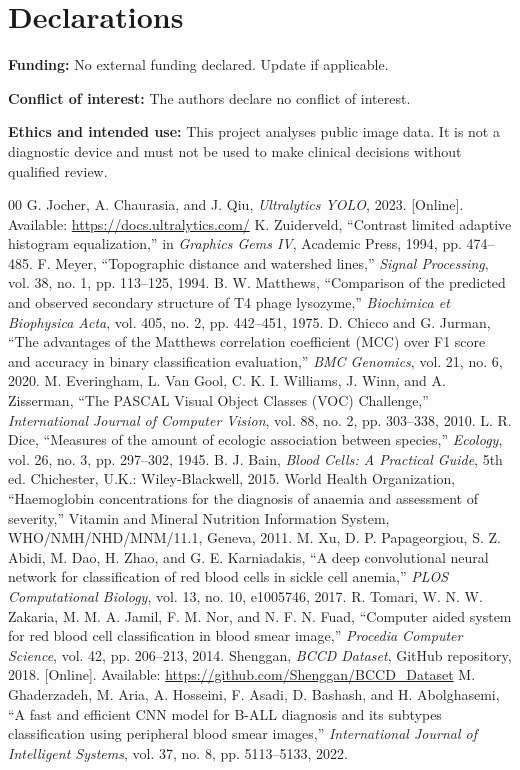 \documentclass[conference]{IEEEtran}
\begin{document}
\section*{Declarations}

\textbf{Funding:} No external funding declared. Update if applicable.

\textbf{Conflict of interest:} The authors declare no conflict of interest.

\textbf{Ethics and intended use:} This project analyses public image data. It is not a diagnostic device and must not be used to make clinical decisions without qualified review.

\begin{thebibliography}{00}
 G. Jocher, A. Chaurasia, and J. Qiu, \emph{Ultralytics YOLO}, 2023. [Online]. Available: \url{https://docs.ultralytics.com/}
 K. Zuiderveld, ``Contrast limited adaptive histogram equalization,'' in \emph{Graphics Gems IV}, Academic Press, 1994, pp. 474--485.
 F. Meyer, ``Topographic distance and watershed lines,'' \emph{Signal Processing}, vol. 38, no. 1, pp. 113--125, 1994.
 B. W. Matthews, ``Comparison of the predicted and observed secondary structure of T4 phage lysozyme,'' \emph{Biochimica et Biophysica Acta}, vol. 405, no. 2, pp. 442--451, 1975.
 D. Chicco and G. Jurman, ``The advantages of the Matthews correlation coefficient (MCC) over F1 score and accuracy in binary classification evaluation,'' \emph{BMC Genomics}, vol. 21, no. 6, 2020.
 M. Everingham, L. Van Gool, C. K. I. Williams, J. Winn, and A. Zisserman, ``The PASCAL Visual Object Classes (VOC) Challenge,'' \emph{International Journal of Computer Vision}, vol. 88, no. 2, pp. 303--338, 2010.
 L. R. Dice, ``Measures of the amount of ecologic association between species,'' \emph{Ecology}, vol. 26, no. 3, pp. 297--302, 1945.
 B. J. Bain, \emph{Blood Cells: A Practical Guide}, 5th ed. Chichester, U.K.: Wiley-Blackwell, 2015.
 World Health Organization, ``Haemoglobin concentrations for the diagnosis of anaemia and assessment of severity,'' Vitamin and Mineral Nutrition Information System, WHO/NMH/NHD/MNM/11.1, Geneva, 2011.
 M. Xu, D. P. Papageorgiou, S. Z. Abidi, M. Dao, H. Zhao, and G. E. Karniadakis, ``A deep convolutional neural network for classification of red blood cells in sickle cell anemia,'' \emph{PLOS Computational Biology}, vol. 13, no. 10, e1005746, 2017.
 R. Tomari, W. N. W. Zakaria, M. M. A. Jamil, F. M. Nor, and N. F. N. Fuad, ``Computer aided system for red blood cell classification in blood smear image,'' \emph{Procedia Computer Science}, vol. 42, pp. 206--213, 2014.
 Shenggan, \emph{BCCD Dataset}, GitHub repository, 2018. [Online]. Available: \url{https://github.com/Shenggan/BCCD_Dataset}
 M. Ghaderzadeh, M. Aria, A. Hosseini, F. Asadi, D. Bashash, and H. Abolghasemi, ``A fast and efficient CNN model for B-ALL diagnosis and its subtypes classification using peripheral blood smear images,'' \emph{International Journal of Intelligent Systems}, vol. 37, no. 8, pp. 5113--5133, 2022.
\end{thebibliography}
\end{document}
